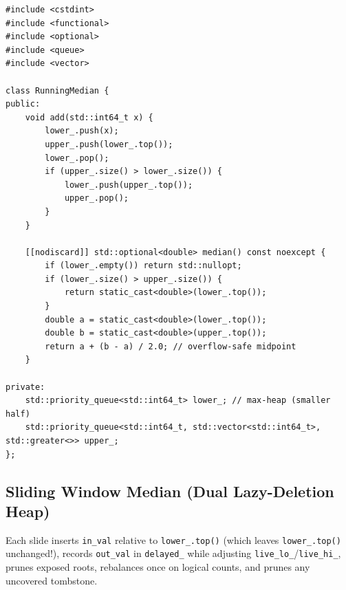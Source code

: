 \documentclass[11pt,a4paper]{article}
\theoremstyle{definition}
\begin{document}
\begin{lstlisting}[caption={Balanced Two-Heap \texttt{RunningMedian} with $O(\log N)$ insert and $O(1)$ query.}]
#include <cstdint>
#include <functional>
#include <optional>
#include <queue>
#include <vector>

class RunningMedian {
public:
    void add(std::int64_t x) {
        lower_.push(x);
        upper_.push(lower_.top());
        lower_.pop();
        if (upper_.size() > lower_.size()) {
            lower_.push(upper_.top());
            upper_.pop();
        }
    }

    [[nodiscard]] std::optional<double> median() const noexcept {
        if (lower_.empty()) return std::nullopt;
        if (lower_.size() > upper_.size()) {
            return static_cast<double>(lower_.top());
        }
        double a = static_cast<double>(lower_.top());
        double b = static_cast<double>(upper_.top());
        return a + (b - a) / 2.0; // overflow-safe midpoint
    }

private:
    std::priority_queue<std::int64_t> lower_; // max-heap (smaller half)
    std::priority_queue<std::int64_t, std::vector<std::int64_t>, std::greater<>> upper_;
};
\end{lstlisting}

\subsection{Sliding Window Median (Dual Lazy-Deletion Heap)}

Each slide inserts \texttt{in\_val} relative to \texttt{lower\_.top()} (which leaves \texttt{lower\_.top()} unchanged!), records \texttt{out\_val} in \texttt{delayed\_} while adjusting \texttt{live\_lo\_}/\texttt{live\_hi\_}, prunes exposed roots, rebalances once on logical counts, and prunes any uncovered tombstone.
\end{document}
